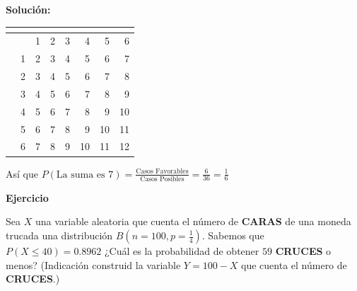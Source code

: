 \documentclass[12pt,spanish,es-nodecimaldot]{article}\usepackage[]{graphicx}\usepackage[]{color}
\newcounter{problemes}
\newcounter{punts} \def\thepunts{\arabic{punts}}
\def\probl{\textbf{\newline\noindent\hspace{-1cm} Ejercicio}\addtocounter{problemes}{1} \setcounter{punts}{0}
\medskip\noindent{\bf \theproblemes) }}
\newif\ifsol
\begin{document}
\textbf{Solución:}


\begin{table}[ht]
\centering
\begin{tabular}{r|rrrrrrr}
&  & \\
  \hline
 & & 1 & 2 & 3 & 4 & 5 & 6 \\ 
  \hline
   &
 1 &   2 &   3 &   4 &   5 &   6 &   7 \\ 
 & 2 &   3 &   4 &   5 &   6 &   7 &   8 \\ 
 &  3 &   4 &   5 &   6 &   7 &   8 &   9 \\ 
 &  4 &   5 &   6 &   7 &   8 &   9 &  10 \\ 
 &  5 &   6 &   7 &   8 &   9 &  10 &  11 \\ 
 &  6 &   7 &   8 &   9 &  10 &  11 &  12 \\   \hline
\end{tabular}
\end{table}





Así que $P( \mbox{La suma es } 7)=\frac{\mbox{Casos Favorables}}{\mbox{Casos Posibles}}=\frac{6}{36}=\frac{1}{6}$
\else
\fi


\probl Sea $X$ una variable aleatoria que  cuenta el número de \textbf{CARAS} de una moneda trucada una distribución $B(n=100,p=\frac{1}{4})$.  Sabemos que $P(X\leq 40)=0.8962$ ¿Cuál es la probabilidad de obtener  $59$ \textbf{CRUCES} o menos? (Indicación construid la variable $Y=100-X$ que cuenta el número de \textbf{CRUCES}.)
\ifsol
\end{document}
